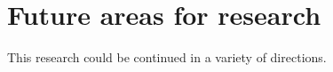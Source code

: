 \documentclass[10pt]{sig-alternate-10pt}
\begin{document}




\section{Future areas for research}

This research could be continued in a variety of directions.
\end{document}
